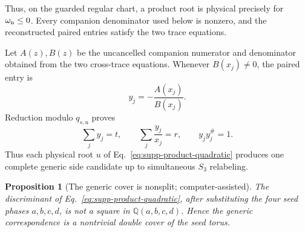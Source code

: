 \documentclass[aps,prx,reprint,nofootinbib,twoside,superscriptaddress,longbibliography,floatfix]{revtex4-2}
\newtheorem{proposition}[theorem]{Proposition}
\theoremstyle{definition}
\begin{document}
Thus, on the guarded regular chart, a product root is physical precisely for $\omega_{\rm n}\leq0$. Every companion denominator used below is nonzero, and the reconstructed paired entries satisfy the two trace equations.

Let $A(z),B(z)$ be the uncancelled companion numerator and denominator obtained from the two cross-trace equations.  Whenever $B(x_j)\ne0$, the paired entry is
\begin{equation}
y_j=-\frac{A(x_j)}{B(x_j)}.
\label{eq:supp-companion}
\end{equation}
Reduction modulo $q_{s,u}$ proves
\begin{equation}
\sum_jy_j=t,\qquad \sum_j\frac{y_j}{x_j}=r,\qquad
y_jy_j^\#=1.
\label{eq:supp-companion-traces}
\end{equation}
Thus each physical root $u$ of Eq.~\eqref{eq:supp-product-quadratic} produces one complete generic side candidate up to simultaneous $S_3$ relabeling.


\begin{proposition}[The generic cover is nonsplit; computer-assisted]
\label{prop:supp-nonsplit}
The discriminant of Eq.~\eqref{eq:supp-product-quadratic}, after substituting the four seed phases $a,b,c,d$, is not a square in $\mathbb Q(a,b,c,d)$.  Hence the generic correspondence is a nontrivial double cover of the seed torus.
\end{proposition}
\end{document}
